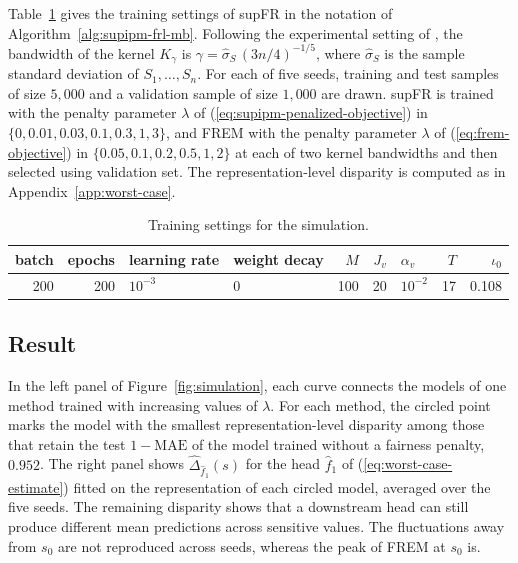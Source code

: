 \documentclass{article} %
\begin{document}
Table~\ref{tab:synth-settings} gives the training settings of supFR in the notation of Algorithm~\ref{alg:supipm-frl-mb}.  Following the experimental setting of \citet{jiang2022generalized}, the bandwidth of the kernel $K_{\gamma}$ is $\gamma=\widehat{\sigma}_S\,(3n/4)^{-1/5}$, where $\widehat{\sigma}_S$ is the sample standard deviation of $S_1,\ldots,S_n$.
For each of five seeds, training and test samples of size $5{,}000$ and a validation sample of size $1{,}000$ are drawn. supFR is trained with the penalty parameter $\lambda$ of (\ref{eq:supipm-penalized-objective}) in $\{0,0.01,0.03,0.1,0.3,1,3\}$, and FREM with the penalty parameter $\lambda$ of (\ref{eq:frem-objective}) in $\{0.05,0.1,0.2,0.5,1,2\}$ at each of two kernel bandwidths and then selected using validation set.  The representation-level disparity is computed as in Appendix~\ref{app:worst-case}.

\begin{table}[!htb]
\centering
\footnotesize
\caption{Training settings for the simulation.}
\label{tab:synth-settings}
\begin{tabular}{rrllrrlrr}
\toprule
batch & epochs & learning rate & weight decay & $M$ & $J_v$ & $\alpha_v$ & $T$ & $\iota_0$ \\
\midrule
200 & 200 & $10^{-3}$ & 0 & 100 & 20 & $10^{-2}$ & 17 & 0.108 \\
\bottomrule
\end{tabular}
\end{table}

\subsection{Result}
\label{app:synth-result}

In the left panel of Figure~\ref{fig:simulation}, each curve connects the models of one method trained with increasing values of $\lambda$.
For each method, the circled point marks the model with the smallest representation-level disparity among those that retain the test $1-\mathrm{MAE}$ of the model trained without a fairness penalty, $0.952$.  The right panel shows $\widehat{\Delta}_{\hat{f}_1}(s)$ for the head $\hat{f}_1$ of (\ref{eq:worst-case-estimate}) fitted on the representation of each circled model, averaged over the five seeds.  The remaining disparity shows that a downstream head can still produce different mean predictions across sensitive values.  The fluctuations away from $s_0$ are not reproduced across seeds, whereas the peak of FREM at $s_0$ is.
\end{document}
